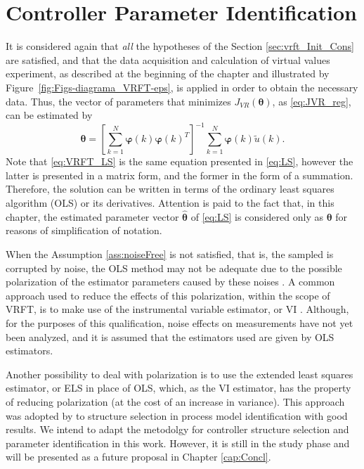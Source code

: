 \section{Controller Parameter Identification}%
\label{sec:controller_parameter_identification}

It is considered again that \textit{all} the hypotheses of the Section \ref{sec:vrft_Init_Cons} are satisfied, and that the data acquisition and calculation of virtual values experiment, as described at the beginning of the chapter and illustrated by Figure~\ref{fig:Figs-diagrama_VRFT-eps}, is applied in order to obtain the necessary data. Thus, the vector of parameters that minimizes $J_{VR}(\bm{\theta})$, as \eqref{eq:JVR_reg}, can be estimated by
\begin{equation}
   \bm{\theta} = \left[\sum_{k=1}^{N} \bm{\varphi}(k) \bm{\varphi}(k)^T\right]^{-1} \sum_{k=1}^{N} \bm{\varphi}(k) \tilde{u}(k).
\label{eq:VRFT_LS} 
\end{equation}
Note that \eqref{eq:VRFT_LS} is the same equation presented in \eqref{eq:LS}, however the latter is presented in a matrix form, and the former in the form of a summation.
Therefore, the solution can be written in terms of the ordinary least squares algorithm (OLS) or its derivatives.
Attention is paid to the fact that, in this chapter, the estimated parameter vector $\hat{\bm{\theta}}$ of \eqref{eq:LS} is considered only as $\bm{\theta}$ for reasons of simplification of notation.

When the Assumption \ref{ass:noiseFree} is not satisfied, that is, the sampled is corrupted by noise, the OLS method may not be adequate due to the possible polarization of the estimator parameters caused by these noises \citep{aguirre2015}. 
A common approach used to reduce the effects of this polarization, within the scope of VRFT, is to make use of the instrumental variable estimator, or VI \citep{young1970}. Although, for the purposes of this qualification, noise effects on measurements have not yet been analyzed, and it is assumed that the estimators used are given by OLS estimators.

Another possibility to deal with polarization is to use the extended least squares estimator, or ELS \citep{ljung1999, aguirre2015} in place of OLS, which, as the VI estimator, has the property of reducing polarization (at the cost of an increase in variance). This approach was adopted by \cite{retesNARMAXModelIdentification2019} to structure selection in process model identification with good results. We intend to adapt the metodolgy for controller structure selection and parameter identification in this work. However, it is still in the study phase and will be presented as a future proposal in Chapter \ref{cap:Concl}.


